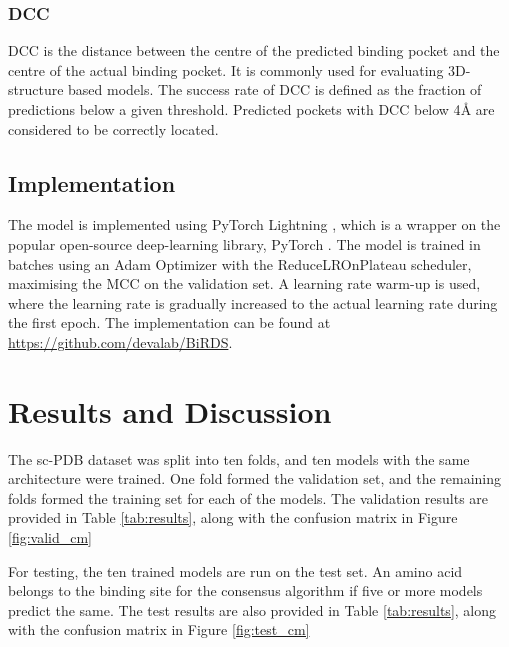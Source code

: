 \documentclass[journal=jacsat,manuscript=article]{achemso}
\begin{document}
\subsubsection{DCC}
DCC is the distance between the centre of the predicted binding pocket and the centre of the actual binding pocket. It is commonly used for evaluating 3D-structure based models. The success rate of DCC is defined as the fraction of predictions below a given threshold. Predicted pockets with DCC below 4{\AA} are considered to be correctly located.

\subsection{Implementation}
\quad The model is implemented using PyTorch Lightning \cite{falcon2019pytorch}, which is a wrapper on the popular open-source deep-learning library, PyTorch \cite{paszke2019pytorch}. The model is trained in batches using an Adam Optimizer with the ReduceLROnPlateau scheduler, maximising the MCC on the validation set. A learning rate warm-up is used, where the learning rate is gradually increased to the actual learning rate during the first epoch. The implementation can be found at \href{https://github.com/devalab/BiRDS}{https://github.com/devalab/BiRDS}.

\section{Results and Discussion}
\quad The sc-PDB\cite{desaphy2015sc} dataset was split into ten folds, and ten models with the same architecture were trained. One fold formed the validation set, and the remaining folds
formed the training set for each of the models. The validation results are provided in Table \ref{tab:results}, along with the confusion matrix in Figure \ref{fig:valid_cm}

For testing, the ten trained models are run on the test set. An amino acid belongs to the binding site for the consensus algorithm if five or more models predict the same. The test results are also provided in Table \ref{tab:results}, along with the confusion matrix in Figure \ref{fig:test_cm}
\end{document}

